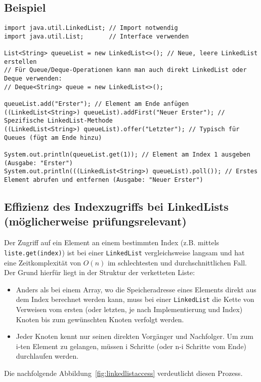 \subsection{Beispiel}
\begin{lstlisting}[caption={Beispiel für die Verwendung einer LinkedList in Java}, label=lst:linkedListExample]
import java.util.LinkedList; // Import notwendig
import java.util.List;       // Interface verwenden

List<String> queueList = new LinkedList<>(); // Neue, leere LinkedList erstellen
// Für Queue/Deque-Operationen kann man auch direkt LinkedList oder Deque verwenden:
// Deque<String> queue = new LinkedList<>();

queueList.add("Erster"); // Element am Ende anfügen
((LinkedList<String>) queueList).addFirst("Neuer Erster"); // Spezifische LinkedList-Methode
((LinkedList<String>) queueList).offer("Letzter"); // Typisch für Queues (fügt am Ende hinzu)

System.out.println(queueList.get(1)); // Element am Index 1 ausgeben (Ausgabe: "Erster")
System.out.println(((LinkedList<String>) queueList).poll()); // Erstes Element abrufen und entfernen (Ausgabe: "Neuer Erster")
\end{lstlisting}

\subsection{Effizienz des Indexzugriffs bei LinkedLists (möglicherweise prüfungsrelevant)}
\label{subsec:LinkedListIndexAccess}
Der Zugriff auf ein Element an einem bestimmten Index (z.B. mittels \texttt{liste.get(index)}) ist bei einer \texttt{LinkedList} vergleichsweise langsam und hat eine Zeitkomplexität von $O(n)$ im schlechtesten und durchschnittlichen Fall. Der Grund hierfür liegt in der Struktur der verketteten Liste:
\begin{itemize}
    \item Anders als bei einem Array, wo die Speicheradresse eines Elements direkt aus
          dem Index berechnet werden kann, muss bei einer \texttt{LinkedList} die Kette
          von Verweisen vom ersten (oder letzten, je nach Implementierung und Index)
          Knoten bis zum gewünschten Knoten verfolgt werden.
    \item Jeder Knoten kennt nur seinen direkten Vorgänger und Nachfolger. Um zum i-ten
          Element zu gelangen, müssen i Schritte (oder n-i Schritte vom Ende) durchlaufen
          werden.
\end{itemize}
Die nachfolgende Abbildung~\ref{fig:linkedlistaccess} verdeutlicht diesen Prozess.

